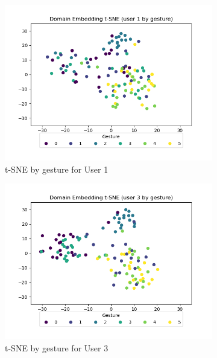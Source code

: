 \begin{figure}[b]
\begin{subfigure}{0.3\textwidth}
		\includegraphics[width=\textwidth]{figures/extended/long_de_u1}
		\caption{t-SNE by gesture for User 1}
	\end{subfigure}
	\hfill
	\begin{subfigure}{0.3\textwidth}
		\centering
		\includegraphics[width=\textwidth]{figures/extended/long_de_u3}
		\caption{t-SNE by gesture for User 3}
	\end{subfigure}
	\hfill
	\begin{subfigure}{0.3\textwidth}
		\centering

\end{subfigure}
\end{figure}
